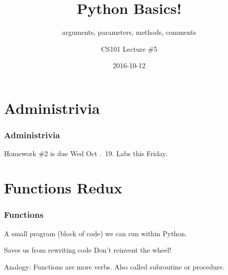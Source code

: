 \documentclass[11pt]{beamer}
\title{Python Basics!}
\subtitle{arguments, parameters, methods, comments}
\author{CS101 Lecture \#5}
\date{2016-10-12}
\begin{document}
  \setcounter{showProgressBar}{0}
  \setcounter{showSlideNumbers}{0}

\frame{\titlepage}

\setcounter{framenumber}{0}
\setcounter{showProgressBar}{1}
\setcounter{showSlideNumbers}{1}

\section{Administrivia}

\begin{frame}
  \frametitle{Administrivia}
  \Enlarge
  \begin{itemize}
  \myitem  Homework \#2 is due Wed Oct .\ 19.
  \myitem  Labs this Friday.
  \end{itemize}
\end{frame}









\section{Functions Redux}

\begin{frame}
  \frametitle{Functions}
  \Enlarge

  \begin{itemize}
  \myitem  A small program (block of code) we can run within Python.
    \begin{itemize}
    \mysubitem  Saves us from rewriting code
    \mysubitem  Don't reinvent the wheel!
    \end{itemize}
  \myitem  Analogy:  Functions are more verbs.
  \myitem  Also called subroutine or procedure.
  \end{itemize}
\end{frame}
\end{document}
